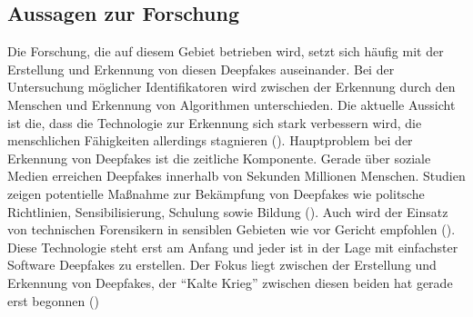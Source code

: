 \subsection{Aussagen zur Forschung}
Die Forschung, die auf diesem Gebiet betrieben wird, setzt sich häufig mit der Erstellung und Erkennung von diesen Deepfakes auseinander.
Bei der Untersuchung möglicher Identifikatoren wird zwischen der Erkennung durch den Menschen und Erkennung von Algorithmen unterschieden.
Die aktuelle Aussicht ist die, dass die Technologie zur Erkennung sich stark verbessern wird, die menschlichen Fähigkeiten allerdings stagnieren (\cite{Mueller2022}).
Hauptproblem bei der Erkennung von Deepfakes ist die zeitliche Komponente.
Gerade über soziale Medien erreichen Deepfakes innerhalb von Sekunden Millionen Menschen.
Studien zeigen potentielle Maßnahme zur Bekämpfung von Deepfakes wie politsche Richtlinien, Sensibilisierung, Schulung sowie Bildung (\cite{Shahzad2022}).
Auch wird der Einsatz von technischen Forensikern in sensiblen Gebieten wie vor Gericht empfohlen (\cite{Jones2022}).
Diese Technologie steht erst am Anfang und jeder ist in der Lage mit einfachster Software Deepfakes zu erstellen.
Der Fokus liegt zwischen der Erstellung und Erkennung von Deepfakes, der ``Kalte Krieg'' zwischen diesen beiden hat gerade erst begonnen (\cite{Masood2022})